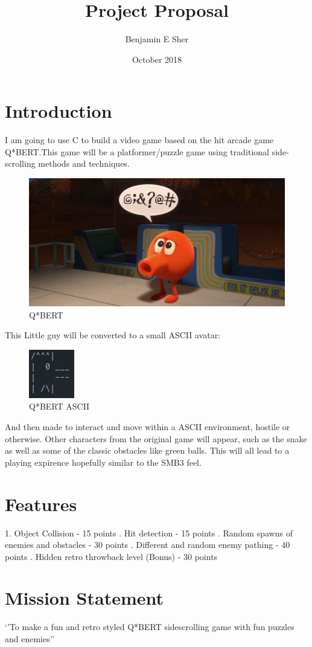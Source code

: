 \documentclass{article}
\title{Project Proposal}
\author{Benjamin E Sher}
\date{October 2018}
\begin{document}
\maketitle
\section{Introduction}
I am going to use C to build a video game based on the hit arcade game
Q*BERT.\@ This game will be a platformer/puzzle game using traditional
side-scrolling methods and techniques.
\begin{figure}[h!]
\centering
\includegraphics[scale=.25]{qbert}
\caption{Q*BERT}
\end{figure}
This Little guy will be converted to a small ASCII avatar:
\begin{figure}[h!]
\centering
\includegraphics[scale=1]{acq}
\caption{Q*BERT ASCII}
\end{figure}
And then made to interact and move within a ASCII environment, hostile or
otherwise. Other characters from the original game will appear, such as the
snake as well as some of the classic obstacles like green balls. This will all
lead to a playing expirence hopefully similar to the SMB3 feel.\@
\newline
\newline
\section{Features}
1. Object Collision - 15 points
. Hit detection - 15 points
. Random spawns of enemies and obstacles - 30 points
. Different and random enemy pathing - 40 points
. Hidden retro throwback level (Bonus) - 30 points
\newline
\section{Mission Statement}
`'To make a fun and retro styled Q*BERT sidescrolling game with fun puzzles and
enemies''
\end{document}
